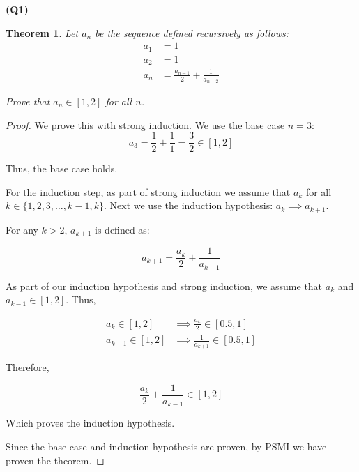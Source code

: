 \documentclass[12pt, a4paper]{article}
\newtheorem{theorem}{Theorem}
\begin{document}
\noindent\textbf{(Q1)}

\begin{theorem}
    Let $a_n$ be the sequence defined recursively as follows:
    \begin{align*}
        a_1 & = 1\\
        a_2 & = 1\\
        a_n &= \frac{a_{n - 1}}{2} + \frac{1}{a_{n-2}}
    \end{align*}

    Prove that $a_n \in [1, 2]$ for all $n$.
\end{theorem}

\begin{proof}
    We prove this with strong induction. We use the base case $n = 3$:
    \[
        a_3 = \frac{1}{2} + \frac{1}{1} = \frac{3}{2} \in [1, 2]
    \]

    Thus, the base case holds.

    For the induction step, as part of strong induction we assume that $a_k$
    for all $k \in \{1, 2, 3, \ldots , k - 1, k\}$. Next we use the induction hypothesis:
    $a_k \implies a_{k + 1}$.

    For any $k > 2$, $a_{k + 1}$ is defined as:

    \[
        a_{k + 1} = \frac{a_{k}}{2} + \frac{1}{a_{k - 1}}
    \]

    As part of our induction hypothesis and strong induction, we assume that $a_k$ and
    $a_{k - 1} \in [1, 2]$. Thus,

    \begin{align*}
        a_k \in [1, 2] & \implies \frac{a_k}{2} \in [0.5, 1]\\
        a_{k + 1} \in [1, 2] & \implies \frac{1}{a_{k + 1}} \in [0.5, 1]
    \end{align*}

    Therefore,

    \[
        \frac{a_{k}}{2} + \frac{1}{a_{k - 1}} \in [1, 2]
    \]

    Which proves the induction hypothesis.

    Since the base case and induction hypothesis are proven, by PSMI we have proven the theorem.
\end{proof}
\end{document}
